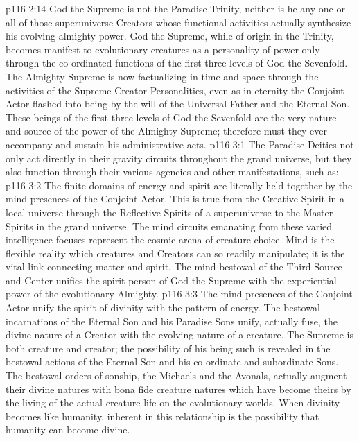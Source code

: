 \vs p116 2:14 God the Supreme is not the Paradise Trinity, neither is he any one or all of those superuniverse Creators whose functional activities actually synthesize his evolving almighty power. God the Supreme, while of origin in the Trinity, becomes manifest to evolutionary creatures as a personality of power only through the co\hyp{}ordinated functions of the first three levels of God the Sevenfold. The Almighty Supreme is now factualizing in time and space through the activities of the Supreme Creator Personalities, even as in eternity the Conjoint Actor flashed into being by the will of the Universal Father and the Eternal Son. These beings of the first three levels of God the Sevenfold are the very nature and source of the power of the Almighty Supreme; therefore must they ever accompany and sustain his administrative acts.
\vs p116 3:1 The Paradise Deities not only act directly in their gravity circuits throughout the grand universe, but they also function through their various agencies and other manifestations, such as:
\pc \vs p116 3:2 \bibnobreakspace {} The finite domains of energy and spirit are literally held together by the mind presences of the Conjoint Actor. This is true from the Creative Spirit in a local universe through the Reflective Spirits of a superuniverse to the Master Spirits in the grand universe. The mind circuits emanating from these varied intelligence focuses represent the cosmic arena of creature choice. Mind is the flexible reality which creatures and Creators can so readily manipulate; it is the vital link connecting matter and spirit. The mind bestowal of the Third Source and Center unifies the spirit person of God the Supreme with the experiential power of the evolutionary Almighty.
\pc \vs p116 3:3 \bibnobreakspace {} The mind presences of the Conjoint Actor unify the spirit of divinity with the pattern of energy. The bestowal incarnations of the Eternal Son and his Paradise Sons unify, actually fuse, the divine nature of a Creator with the evolving nature of a creature. The Supreme is both creature and creator; the possibility of his being such is revealed in the bestowal actions of the Eternal Son and his co\hyp{}ordinate and subordinate Sons. The bestowal orders of sonship, the Michaels and the Avonals, actually augment their divine natures with bona fide creature natures which have become theirs by the living of the actual creature life on the evolutionary worlds. When divinity becomes like humanity, inherent in this relationship is the possibility that humanity can become divine.
